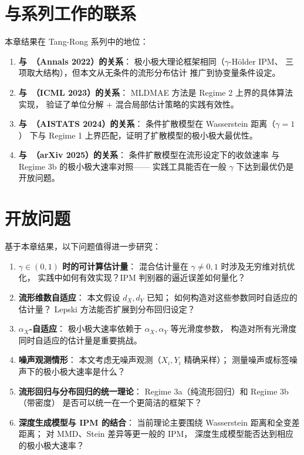 \section{与系列工作的联系}\label{sec:ch2-connections}

本章结果在 Tang-Rong 系列中的地位：

\begin{enumerate}
    \item \textbf{与~\citep{tang2022minimax}（Annals 2022）的关系}：
          极小极大理论框架相同（$\gamma$-Hölder IPM、
          三项取大结构），但本文从无条件的流形分布估计
          推广到协变量条件设定。
    \item \textbf{与~\citep{tang2023lowdim}（ICML 2023）的关系}：
          MLDMAE 方法是 Regime 2 上界的具体算法实现，
          验证了单位分解 + 混合局部估计策略的实践有效性。
    \item \textbf{与~\citep{tang2024diffusion}（AISTATS 2024）的关系}：
          条件扩散模型在 Wasserstein 距离（$\gamma=1$）
          下与 Regime 1 上界匹配，证明了扩散模型的极小极大最优性。
    \item \textbf{与~\citep{tang2025conditional}（arXiv 2025）的关系}：
          条件扩散模型在流形设定下的收敛速率
          与 Regime 3b 的极小极大速率对照——
          实践工具能否在一般 $\gamma$ 下达到最优仍是开放问题。
\end{enumerate}

\section{开放问题}\label{sec:ch2-open}

基于本章结果，以下问题值得进一步研究：

\begin{enumerate}
    \item \textbf{$\gamma \in (0,1)$ 时的可计算估计量}：
          混合估计量在 $\gamma \neq 0, 1$ 时涉及无穷维对抗优化，
          实践中如何有效实现？IPM 判别器的逼近误差如何量化？
    \item \textbf{流形维数自适应}：
          本文假设 $d_X, d_Y$ 已知；
          如何构造对这些参数同时自适应的估计量？
          Lepski 方法能否扩展到分布回归设定？
    \item \textbf{$\alpha_X$-自适应}：
          极小极大速率依赖于 $\alpha_X, \alpha_Y$ 等光滑度参数，
          构造对所有光滑度同时自适应的估计量是重要挑战。
    \item \textbf{噪声观测情形}：
          本文考虑无噪声观测（$X_i, Y_i$ 精确采样）；
          测量噪声或标签噪声下的极小极大速率是什么？
    \item \textbf{流形回归与分布回归的统一理论}：
          Regime 3a（纯流形回归）和 Regime 3b（带密度）
          是否可以统一在一个更简洁的框架下？
    \item \textbf{深度生成模型与 IPM 的结合}：
          当前理论主要围绕 Wasserstein 距离和全变差距离；
          对 MMD、Stein 差异等更一般的 IPM，
          深度生成模型能否达到相应的极小极大速率？
\end{enumerate}

